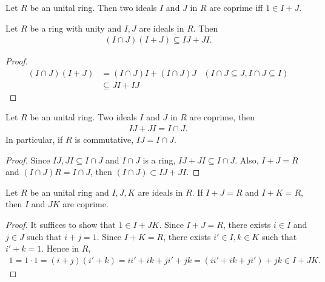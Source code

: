 \begin{proposition}{}{}
    Let $R$ be an unital ring. Then two ideals $I$ and $J$ in $R$
    are coprime iff $1\in I+J$.
\end{proposition}

\begin{proposition}{}{}
    Let $R$ be a ring with unity and $I,J$ are ideals in $R$. Then
    \begin{align*}
        (I\cap J)(I+J)\subseteq IJ+JI.
    \end{align*}
\end{proposition}
\begin{proof}
    \begin{align*}
        (I\cap J)(I+J)&= (I\cap J)I + (I\cap J)J &(I\cap J\subseteq J, I\cap J\subseteq I)\\
                      &\subseteq JI+IJ 
    \end{align*}
\end{proof}

\begin{lemma}{}{}
    Let $R$ be an unital ring. Two ideals $I$ and $J$ in $R$ are coprime, then
    \begin{align*}
        IJ+JI=I\cap J.
    \end{align*}  
    In particular, if $R$ is commutative, $IJ=I\cap J$.
\end{lemma}

\begin{proof}
    Since $IJ,JI\subseteq I\cap J$ and $I\cap J$ is a ring, $IJ+JI\subseteq I\cap J$.
    Also, $I+J=R$ and $(I\cap J)R=I\cap J$, then $(I\cap J)\subset IJ+JI$.
\end{proof}

\begin{lemma}{}{}
    Let $R$ be an unital ring and $I,J,K$ are ideals in $R$. If $I+J=R$ and $I+K=R$, 
    then $I$ and $JK$ are coprime.
\end{lemma}

\begin{proof}
    It suffices to show that $1\in I+JK$. Since $I+J=R$, there exists $i\in I$ and $j\in J$
    such that $i+j=1$. Since $I+K=R$, there exists $i'\in I, k\in K$ such that $i'+k=1$.
    Hence in $R$,
    \begin{align*}
        1=1\cdot 1=(i+j)(i'+k)=ii'+ik+ji'+jk=(ii'+ik+ji')+jk\in I+JK.
    \end{align*}
\end{proof}


